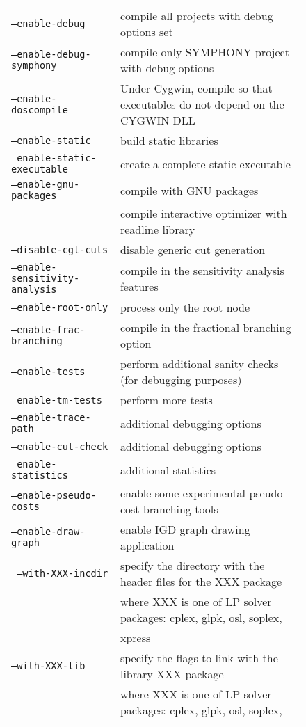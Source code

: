 \begin{figure}[htb]
\begin{tabular}{ll}
\hline
\texttt{--enable-debug} & compile all projects with debug options set \\
\texttt{--enable-debug-symphony} & compile only SYMPHONY project with debug options \\
\texttt{--enable-doscompile} & Under Cygwin, compile so that executables do
not depend on the CYGWIN DLL \\
\texttt{--enable-static} & build static libraries \\
\texttt{--enable-static-executable} &  create a complete static executable \\
\texttt{--enable-gnu-packages} & compile with GNU packages \\ 
& compile interactive optimizer with readline library \\
\hline
\texttt{--disable-cgl-cuts} & disable generic cut generation \\
\texttt{--enable-sensitivity-analysis} & compile in the sensitivity analysis features \\
\texttt{--enable-root-only} & process only the root node \\
\texttt{--enable-frac-branching} & compile in the fractional branching option \\
\texttt{--enable-tests}&  perform additional sanity checks (for debugging purposes) \\
\texttt{--enable-tm-tests }& perform more tests  \\
\texttt{--enable-trace-path}&  additional debugging options \\
\texttt{--enable-cut-check}& additional debugging options \\
\texttt{--enable-statistics}& additional statistics \\
\texttt{--enable-pseudo-costs}& enable some experimental pseudo-cost branching tools \\
\texttt{--enable-draw-graph} &  enable IGD graph drawing application \\
\hline
\texttt{ --with-XXX-incdir} &  specify the directory with the header files for the XXX package \\ 
&where XXX is one of LP solver packages: cplex, glpk, osl, soplex, \\ 
& xpress \\
\texttt{--with-XXX-lib} &  specify the flags to link with the library  
XXX package \\ 
&where XXX is one of LP solver packages: cplex, glpk, osl, soplex, \\ 

\end{tabular}
\end{figure}
